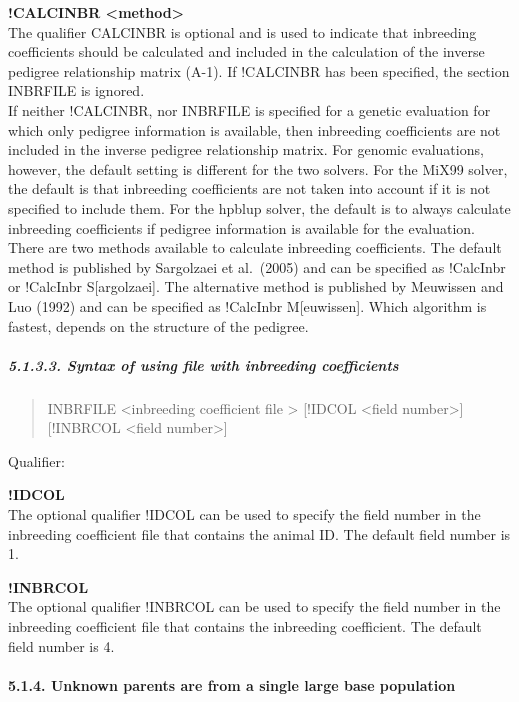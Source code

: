 \textbf{!CALCINBR \textless method\textgreater{}}\\
The qualifier CALCINBR is optional and is used to indicate that
inbreeding coefficients should be calculated and included in the
calculation of the inverse pedigree relationship matrix (A-1). If
!CALCINBR has been specified, the section INBRFILE is ignored.\\
If neither !CALCINBR, nor INBRFILE is specified for a genetic evaluation
for which only pedigree information is available, then inbreeding
coefficients are not included in the inverse pedigree relationship
matrix. For genomic evaluations, however, the default setting is
different for the two solvers. For the MiX99 solver, the default is that
inbreeding coefficients are not taken into account if it is not
specified to include them. For the hpblup solver, the default is to
always calculate inbreeding coefficients if pedigree information is
available for the evaluation.\\
There are two methods available to calculate inbreeding coefficients.
The default method is published by Sargolzaei et al.~(2005) and can be
specified as !CalcInbr or !CalcInbr S{[}argolzaei{]}. The alternative
method is published by Meuwissen and Luo (1992) and can be specified as
!CalcInbr M{[}euwissen{]}. Which algorithm is fastest, depends on the
structure of the pedigree.

\subparagraph{5.1.3.3. Syntax of using file with inbreeding
coefficients}\label{Gene10}

\begin{quote}
INBRFILE \textless inbreeding coefficient file \textgreater{} {[}!IDCOL
\textless field number\textgreater{]} {[}!INBRCOL \textless field
number\textgreater{]}
\end{quote}

Qualifier:

\textbf{!IDCOL }\\
The optional qualifier !IDCOL can be used to specify the field number in
the inbreeding coefficient file that contains the animal ID. The default
field number is 1.

\textbf{!INBRCOL }\\
The optional qualifier !INBRCOL can be used to specify the field number
in the inbreeding coefficient file that contains the inbreeding
coefficient. The default field number is 4.

\paragraph{5.1.4. Unknown parents are from a single large base
population}\label{Gene12}

